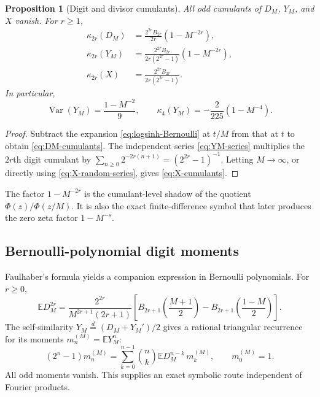 \documentclass[11pt,oneside]{article}
\newtheorem{proposition}[theorem]{Proposition}
\theoremstyle{definition}
\theoremstyle{remark}
\newcommand{\Var}{\operatorname{Var}}
\numberwithin{equation}{section}
\newcommand{\1}{\mathbf 1}
\begin{document}
\begin{proposition}[Digit and divisor cumulants]
\label{prop:cumulants}
All odd cumulants of $D_M$, $Y_M$, and $X$ vanish.  For $r\ge1$,
\begin{align}
 \kappa_{2r}(D_M)
 &=\frac{2^{2r}B_{2r}}{2r}\left(1-M^{-2r}\right),
 \label{eq:DM-cumulants}\\
 \kappa_{2r}(Y_M)
 &=\frac{2^{2r}B_{2r}}{2r(2^{2r}-1)}
   \left(1-M^{-2r}\right),
 \label{eq:YM-cumulants}\\
 \kappa_{2r}(X)
 &=\frac{2^{2r}B_{2r}}{2r(2^{2r}-1)}.
 \label{eq:X-cumulants}
\end{align}
In particular,
\begin{equation}
 \Var(Y_M)=\frac{1-M^{-2}}9,
 \qquad
 \kappa_4(Y_M)=-\frac2{225}(1-M^{-4}).
 \label{eq:first-cumulants}
\end{equation}
\end{proposition}

\begin{proof}
Subtract the expansion \eqref{eq:logsinh-Bernoulli} at $t/M$ from that at $t$ to
obtain \eqref{eq:DM-cumulants}.  The independent series \eqref{eq:YM-series} multiplies
the $2r$th digit cumulant by
$\sum_{n\ge0}2^{-2r(n+1)}=(2^{2r}-1)^{-1}$.  Letting $M\to\infty$, or directly using
\eqref{eq:X-random-series}, gives \eqref{eq:X-cumulants}.
\end{proof}

The factor $1-M^{-2r}$ is the cumulant-level shadow of the quotient
$\Phi(z)/\Phi(z/M)$.  It is also the exact finite-difference symbol that later produces the
zero zeta factor $1-M^{-s}$.

\subsection{Bernoulli-polynomial digit moments}

Faulhaber's formula yields a companion expression in Bernoulli polynomials.  For $r\ge0$,
\begin{equation}
 \mathbb E D_M^{2r}
 =\frac{2^{2r}}{M^{2r+1}(2r+1)}
 \left[
 B_{2r+1}\!\left(\frac{M+1}{2}\right)
 -B_{2r+1}\!\left(\frac{1-M}{2}\right)
 \right].
 \label{eq:DM-Bernoulli-polynomial}
\end{equation}
The self-similarity $Y_M\overset d=(D_M+Y_M')/2$ gives a rational triangular recurrence
for its moments $m_n^{(M)}=\mathbb E Y_M^n$:
\begin{equation}
 (2^n-1)m_n^{(M)}
 =\sum_{k=0}^{n-1}\binom nk
 \mathbb E D_M^{n-k}\,m_k^{(M)},
 \qquad m_0^{(M)}=1.
 \label{eq:moment-recurrence}
\end{equation}
All odd moments vanish.  This supplies an exact symbolic route independent of Fourier
products.
\end{document}

